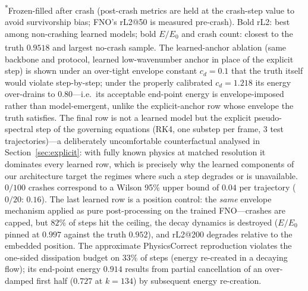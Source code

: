 \documentclass[11pt,a4paper]{article}
\begin{document}
\begin{table}[htbp]
\begin{minipage}{\linewidth}
\textsuperscript{*}Frozen-filled after crash (post-crash metrics are held at the crash-step value to avoid survivorship bias; FNO's rL2@50 is measured pre-crash). Bold rL2: best among non-crashing learned models; bold $E/E_0$ and crash count: closest to the truth $0.9518$ and largest no-crash sample. \textsuperscript{\dag}The learned-anchor ablation (same backbone and protocol, learned low-wavenumber anchor in place of the explicit step) is shown under an over-tight envelope constant $c_d{=}0.1$ that the truth itself would violate step-by-step; under the properly calibrated $c_d{=}1.218$ its energy over-drains to $0.80$---i.e.\ its acceptable end-point energy is envelope-imposed rather than model-emergent, unlike the explicit-anchor row whose envelope the truth satisfies. The final row is not a learned model but the explicit pseudo-spectral step of the governing equations (RK4, one substep per frame, $3$ test trajectories)---a deliberately uncomfortable counterfactual analysed in Section~\ref{sec:explicit}: with fully known physics at matched resolution it dominates every learned row, which is precisely why the learned components of our architecture target the regimes where such a step degrades or is unavailable. $0/100$ crashes correspond to a Wilson 95\% upper bound of $0.04$ per trajectory ($0/20$: $0.16$). The last learned row is a position control: the \emph{same} envelope mechanism applied as pure post-processing on the trained FNO---crashes are capped, but $82\%$ of steps hit the ceiling, the decay dynamics is destroyed ($E/E_0$ pinned at $0.997$ against the truth $0.952$), and rL2@200 degrades relative to the embedded position. The approximate PhysicsCorrect reproduction violates the one-sided dissipation budget on $33\%$ of steps (energy re-created in a decaying flow); its end-point energy $0.914$ results from partial cancellation of an over-damped first half ($0.727$ at $k{=}134$) by subsequent energy re-creation.
\end{minipage}
\end{table}
\end{document}
